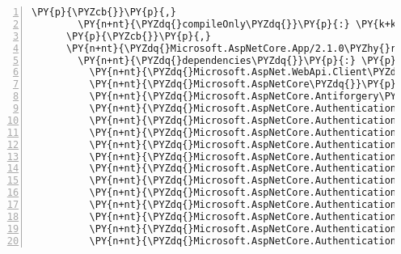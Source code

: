 \begin{Verbatim}[commandchars=\\\{\},numbers=left,firstnumber=1,stepnumber=1,numberblanklines=0]
        \PY{p}{\PYZcb{}}\PY{p}{,}
        \PY{n+nt}{\PYZdq{}compileOnly\PYZdq{}}\PY{p}{:} \PY{k+kc}{true}
      \PY{p}{\PYZcb{}}\PY{p}{,}
      \PY{n+nt}{\PYZdq{}Microsoft.AspNetCore.App/2.1.0\PYZhy{}rc1\PYZhy{}final\PYZdq{}}\PY{p}{:} \PY{p}{\PYZob{}}
        \PY{n+nt}{\PYZdq{}dependencies\PYZdq{}}\PY{p}{:} \PY{p}{\PYZob{}}
          \PY{n+nt}{\PYZdq{}Microsoft.AspNet.WebApi.Client\PYZdq{}}\PY{p}{:} \PY{l+s+s2}{\PYZdq{}5.2.4\PYZdq{}}\PY{p}{,}
          \PY{n+nt}{\PYZdq{}Microsoft.AspNetCore\PYZdq{}}\PY{p}{:} \PY{l+s+s2}{\PYZdq{}2.1.0\PYZhy{}rc1\PYZhy{}final\PYZdq{}}\PY{p}{,}
          \PY{n+nt}{\PYZdq{}Microsoft.AspNetCore.Antiforgery\PYZdq{}}\PY{p}{:} \PY{l+s+s2}{\PYZdq{}2.1.0\PYZhy{}rc1\PYZhy{}final\PYZdq{}}\PY{p}{,}
          \PY{n+nt}{\PYZdq{}Microsoft.AspNetCore.Authentication\PYZdq{}}\PY{p}{:} \PY{l+s+s2}{\PYZdq{}2.1.0\PYZhy{}rc1\PYZhy{}final\PYZdq{}}\PY{p}{,}
          \PY{n+nt}{\PYZdq{}Microsoft.AspNetCore.Authentication.Abstractions\PYZdq{}}\PY{p}{:} \PY{l+s+s2}{\PYZdq{}2.1.0\PYZhy{}rc1\PYZhy{}final\PYZdq{}}\PY{p}{,}
          \PY{n+nt}{\PYZdq{}Microsoft.AspNetCore.Authentication.Cookies\PYZdq{}}\PY{p}{:} \PY{l+s+s2}{\PYZdq{}2.1.0\PYZhy{}rc1\PYZhy{}final\PYZdq{}}\PY{p}{,}
          \PY{n+nt}{\PYZdq{}Microsoft.AspNetCore.Authentication.Core\PYZdq{}}\PY{p}{:} \PY{l+s+s2}{\PYZdq{}2.1.0\PYZhy{}rc1\PYZhy{}final\PYZdq{}}\PY{p}{,}
          \PY{n+nt}{\PYZdq{}Microsoft.AspNetCore.Authentication.Facebook\PYZdq{}}\PY{p}{:} \PY{l+s+s2}{\PYZdq{}2.1.0\PYZhy{}rc1\PYZhy{}final\PYZdq{}}\PY{p}{,}
          \PY{n+nt}{\PYZdq{}Microsoft.AspNetCore.Authentication.Google\PYZdq{}}\PY{p}{:} \PY{l+s+s2}{\PYZdq{}2.1.0\PYZhy{}rc1\PYZhy{}final\PYZdq{}}\PY{p}{,}
          \PY{n+nt}{\PYZdq{}Microsoft.AspNetCore.Authentication.JwtBearer\PYZdq{}}\PY{p}{:} \PY{l+s+s2}{\PYZdq{}2.1.0\PYZhy{}rc1\PYZhy{}final\PYZdq{}}\PY{p}{,}
          \PY{n+nt}{\PYZdq{}Microsoft.AspNetCore.Authentication.MicrosoftAccount\PYZdq{}}\PY{p}{:} \PY{l+s+s2}{\PYZdq{}2.1.0\PYZhy{}rc1\PYZhy{}final\PYZdq{}}\PY{p}{,}
          \PY{n+nt}{\PYZdq{}Microsoft.AspNetCore.Authentication.OAuth\PYZdq{}}\PY{p}{:} \PY{l+s+s2}{\PYZdq{}2.1.0\PYZhy{}rc1\PYZhy{}final\PYZdq{}}\PY{p}{,}
          \PY{n+nt}{\PYZdq{}Microsoft.AspNetCore.Authentication.OpenIdConnect\PYZdq{}}\PY{p}{:} \PY{l+s+s2}{\PYZdq{}2.1.0\PYZhy{}rc1\PYZhy{}final\PYZdq{}}\PY{p}{,}
          \PY{n+nt}{\PYZdq{}Microsoft.AspNetCore.Authentication.Twitter\PYZdq{}}\PY{p}{:} \PY{l+s+s2}{\PYZdq{}2.1.0\PYZhy{}rc1\PYZhy{}final\PYZdq{}}\PY{p}{,}
          \PY{n+nt}{\PYZdq{}Microsoft.AspNetCore.Authentication.WsFederation\PYZdq{}}\PY{p}{:} \PY{l+s+s2}{\PYZdq{}2.1.0\PYZhy{}rc1\PYZhy{}final\PYZdq{}}\PY{p}{,}

\end{Verbatim}
